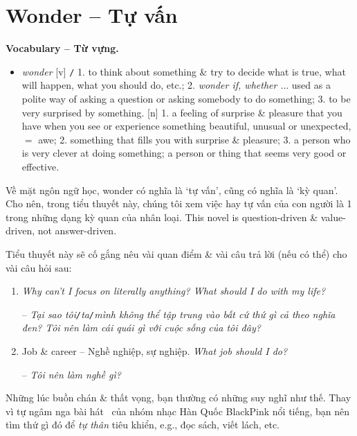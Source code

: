 \documentclass[12pt,oneside]{book}
\begin{document}
\section{Wonder -- Tự vấn}
\textbf{\textsf{\small Vocabulary -- Từ vựng.}}
\begin{itemize}\small\sf
	\item {\it wonder} [v] {\tt/} 1. to think about something \& try to decide what is true, what will happen, what you should do, etc.; 2. {\it wonder if, whether $\ldots$} used as a polite way of asking a question or asking somebody to do something; 3. to be very surprised by something. [n] 1. a feeling of surprise \& pleasure that you have when you see or experience something beautiful, unusual or unexpected, $=$ {\sf awe}; 2. something that fills you with surprise \& pleasure; 3. a person who is very clever at doing something; a person or thing that seems very good or effective.
\end{itemize}
Về mặt ngôn ngữ học, wonder có nghĩa là `tự vấn', cũng có nghĩa là `kỳ quan'. Cho nên, trong tiểu thuyết này, chúng tôi xem việc hay tự vấn của con người là 1 trong những dạng kỳ quan của nhân loại. This novel is question-driven \& value-driven, not answer-driven.

Tiểu thuyết này sẽ cố gắng nêu vài quan điểm \& vài câu trả lời (nếu có thể) cho vài câu hỏi sau:
\begin{enumerate}
	\item {\it Why can't I focus on literally anything? What should I do with my life?}
	
	-- {\it Tại sao tôi{\tt/}ta{\tt/}mình không thể tập trung vào bất cứ thứ gì cả theo nghĩa đen? Tôi nên làm cái quái gì với cuộc sống của tôi đây?}
	\item {\sf Job \& career -- Nghề nghiệp, sự nghiệp.} {\it What job should I do?}
	
	-- {\it Tôi nên làm nghề gì?}
\end{enumerate}
Những lúc buồn chán \& thất vọng, bạn thường có những suy nghĩ như thế. Thay vì tự ngâm nga bài hát \musEighth[\href{https://www.youtube.com/watch?v=bqzDuRz_P7g}{\it Don't Know What To Do}]\musEighth\ của nhóm nhạc Hàn Quốc {\sc BlackPink} nổi tiếng, bạn nên tìm thứ gì đó để {\it tự thân} tiêu khiển, e.g., đọc sách, viết lách, etc.

\end{document}
